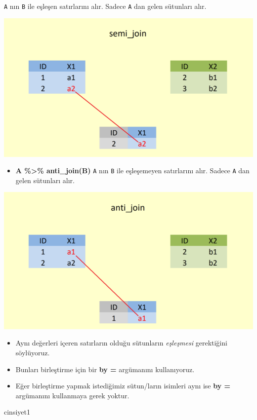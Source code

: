 \documentclass[
  oneside]{book}
\providecommand{\tightlist}{%
  \setlength{\itemsep}{0pt}\setlength{\parskip}{0pt}}
\begin{document}
\texttt{A} nın \texttt{B} ile eşleşen satırlarını alır. Sadece \texttt{A} dan gelen sütunları alır.

\begin{center}\includegraphics[width=0.75\linewidth]{images/semi_join} \end{center}

\begin{itemize}
\tightlist
\item
  \textbf{A \%\textgreater\% anti\_join(B)}
  \texttt{A} nın \texttt{B} ile eşleşemeyen satırlarını alır. Sadece \texttt{A} dan gelen sütunları alır.
\end{itemize}

\begin{center}\includegraphics[width=0.75\linewidth]{images/anti_join} \end{center}

\begin{itemize}
\item
  Aynı değerleri içeren satırların olduğu sütunların \emph{eşleşmesi} gerektiğini söylüyoruz.
\item
  Bunları birleştirme için bir \textbf{by =} argümanını kullanıyoruz.
\item
  Eğer birleştirme yapmak istediğimiz sütun/ların isimleri aynı ise \textbf{by =} argümanını kullanmaya gerek yoktur.
\end{itemize}

cinsiyet1
\end{document}
